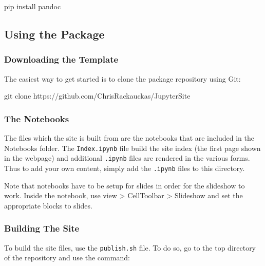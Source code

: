 \documentclass[11pt]{article}
\newenvironment{Shaded}{}{}
\newcommand{\FunctionTok}[1]{\textcolor[rgb]{0.02,0.16,0.49}{{#1}}}
\newcommand{\NormalTok}[1]{{#1}}
\newcommand{\ExtensionTok}[1]{{#1}}
\begin{document}
\begin{Shaded}
\begin{Highlighting}[]
\ExtensionTok{pip}\NormalTok{ install pandoc}
\end{Highlighting}
\end{Shaded}

    \subsection{Using the Package}\label{using-the-package}

\subsubsection{Downloading the Template}\label{downloading-the-template}

The easiest way to get started is to clone the package repository using
Git:

\begin{Shaded}
\begin{Highlighting}[]
\FunctionTok{git}\NormalTok{ clone https://github.com/ChrisRackauckas/JupyterSite}
\end{Highlighting}
\end{Shaded}

    \subsubsection{The Notebooks}\label{the-notebooks}

The files which the site is built from are the notebooks that are
included in the Notebooks folder. The \texttt{Index.ipynb} file build
the site index (the first page shown in the webpage) and additional
\texttt{.ipynb} files are rendered in the various forms. Thus to add
your own content, simply add the \texttt{.ipynb} files to this
directory.

Note that notebooks have to be setup for slides in order for the
slideshow to work. Inside the notebook, use view \textgreater{}
CellToolbar \textgreater{} Slideshow and set the appropriate blocks to
slides.

    \subsubsection{Building The Site}\label{building-the-site}

To build the site files, use the \texttt{publish.sh} file. To do so, go
to the top directory of the repository and use the command:
\end{document}
